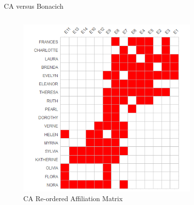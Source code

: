 \documentclass[
  ignorenonframetext,
]{beamer}
\begin{document}
\begin{frame}{CA versus Bonacich}
\protect\hypertarget{ca-versus-bonacich-5}{}
\begin{columns}[T]
\begin{column}{0.5\textwidth}
\begin{figure}

{\centering \includegraphics{Plots/ca-reord.png}

}

\caption{CA Re-ordered Affiliation Matrix}

\end{figure}
\end{column}

\begin{column}{0.5\textwidth}
\begin{figure}


\end{figure}
\end{column}
\end{columns}
\end{frame}
\end{document}
